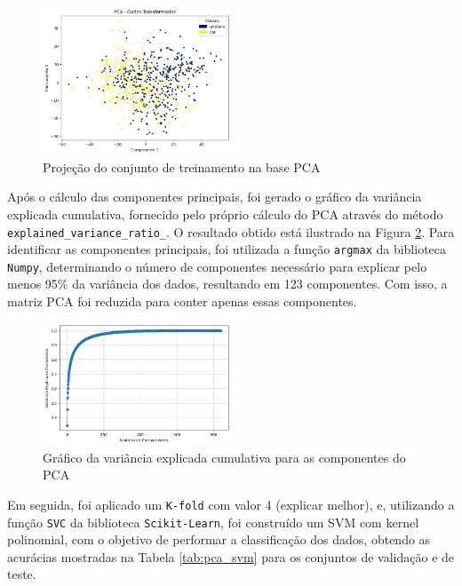 \documentclass[]{abntex2}
\begin{document}
\begin{figure}[H]
    \centering 
    \includegraphics[width=0.5\textwidth]{imgs/ex1/PCA.png}
    \caption{Projeção do conjunto de treinamento na base PCA}
    \label{fig:PCA} %
\end{figure}

Após o cálculo das componentes principais, foi gerado o gráfico da variância explicada cumulativa, fornecido pelo próprio cálculo do PCA através do método \texttt{explained\_variance\_ratio\_}. O  resultado obtido está ilustrado na Figura \ref{fig:vari_pca}. Para identificar as componentes principais, foi utilizada a função \texttt{argmax} da biblioteca \texttt{Numpy}, determinando o número de componentes necessário para explicar pelo menos 95\% da variância dos dados, resultando em 123 componentes. Com isso, a matriz PCA foi reduzida para conter apenas essas componentes.

\begin{figure}[H]
    \centering 
    \includegraphics[width=0.5\textwidth]{imgs/ex1/vari_pca.png}
    \caption{Gráfico da variância explicada cumulativa para as componentes do PCA}
    \label{fig:vari_pca} %
\end{figure}

Em seguida, foi aplicado um \texttt{K-fold} com valor 4 {\color{red}(explicar melhor)}, e, utilizando a função \texttt{SVC} da biblioteca \texttt{Scikit-Learn}, foi construído um SVM com kernel polinomial, com o objetivo de performar a classificação dos dados, obtendo as acurácias mostradas na Tabela \ref{tab:pca_svm} para os conjuntos de validação e de teste.
\end{document}
